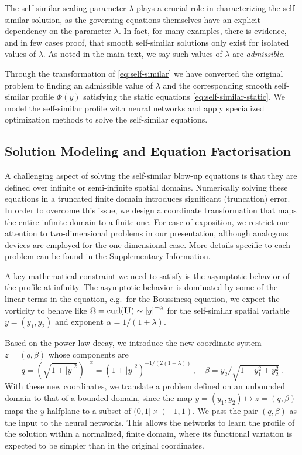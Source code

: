 \documentclass[fleqn,11pt]{wlscirep}
\newcommand{\abs}[1]{\left|#1\right|}
\begin{document}
The self-similar scaling parameter $\lambda$ plays a crucial role in characterizing the self-similar solution, as the governing equations themselves have an explicit dependency on the parameter $\lambda$. In fact, for many examples, there is evidence, and in few cases proof\cite{eggers2008}, that smooth self-similar solutions only exist for isolated values of $\lambda$.  As noted in the main text, we say such values of $\lambda$ are \textit{admissible}.

Through the transformation of \cref{eq:self-similar} we have converted the original problem to finding an admissible value of $\lambda$ and the corresponding smooth self-similar profile $\Phi(y)$ satisfying the static equations \cref{eq:self-similar-static}. We model the self-similar profile with neural networks and apply specialized optimization methods to solve the self-similar equations.

\subsection*{Solution Modeling and Equation Factorisation}
\label{methods:solution_modeling}
A challenging aspect of solving the self-similar blow-up equations is that they are defined over infinite or semi-infinite spatial domains. Numerically solving these equations in a truncated finite domain introduces significant (truncation) error. In order to overcome this issue, we design a coordinate transformation that maps the entire infinite domain to a finite one\cite{grosch1977numerical,lushnikov2017new,boyd1987spectral}. For ease of exposition, we restrict our attention to two-dimensional problems in our presentation, although analogous devices are employed for the one-dimensional case. More details specific to each problem can be found in the Supplementary Information.

A key mathematical constraint we need to satisfy is the asymptotic behavior of the profile at infinity. The asymptotic behavior is dominated by some of the linear terms in the equation, e.g.\ for the Boussinesq equation, we expect the vorticity to behave like $\Omega = \text{curl}({\bf U}) \sim  \abs{y}^{-\alpha}$ for the self-similar spatial variable $y=(y_1,y_2)$ and exponent $\alpha = 1/(1+\lambda)$.

Based on the power-law decay, we introduce the new coordinate system $z = (q, \beta)$ whose components are
\begin{equation}
    q = (\sqrt{1+\abs{y}^2})^{-\alpha} = (1+\abs{y}^2)^{-1/(2(1+\lambda))} \,, \quad
    \beta = y_2/\sqrt{1+y_1^2 + y_2^2} \,.
\end{equation}
With these new coordinates, we translate a problem defined on an unbounded domain to that of a bounded domain, since the map $y = (y_1, y_2) \mapsto z = (q, \beta)$ maps the $y$-halfplane to a subset of $(0, 1] \times (-1, 1)$. We pass the pair $(q, \beta)$ as the input to the neural networks. This allows the networks to learn the profile of the solution within a normalized, finite domain, where its functional variation is expected to be simpler than in the original coordinates.
\end{document}
